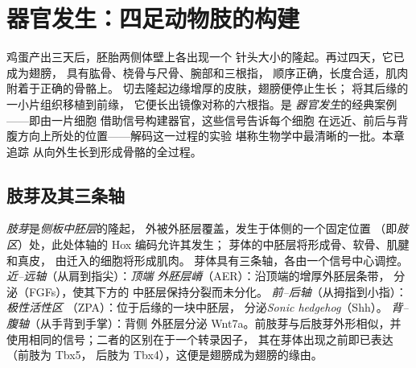 \chapter{器官发生：四足动物肢的构建}\label{ch:b2:limb-organogenesis}

鸡蛋产出三天后，胚胎两侧体壁上各出现一个
针头大小的隆起。再过四天，它已成为翅膀，
具有肱骨、桡骨与尺骨、腕部和三根指，
顺序正确，长度合适，肌肉附着于正确的骨骼上。
切去隆起边缘增厚的皮肤，翅膀便停止生长；
将其后缘的一小片组织移植到前缘，
它便长出镜像对称的六根指。是
\emph{器官发生}的经典案例——即由一片细胞
借助信号构建器官，这些信号告诉每个细胞
在远近、前后与背腹方向上所处的位置——解码这一过程的实验
堪称生物学中最清晰的一批。本章追踪
从向外生长到形成骨骼的全过程。

\section{肢芽及其三条轴}

\begin{definition}[肢芽]\label{def:b2:limb-organogenesis:bud}
\emph{肢芽}是\emph{侧板中胚层}的隆起，
外被外胚层覆盖，发生于体侧的一个固定位置
（即\emph{肢区}）处，此处体轴的 Hox 编码允许其发生；
芽体的中胚层将形成骨、软骨、肌腱和真皮，
由迁入的细胞将形成肌肉。
芽体具有三条轴，各由一个信号中心调控。
\emph{近–远轴}（从肩到指尖）：\emph{顶端
外胚层嵴}（AER）：沿顶端的增厚外胚层条带，
分泌（FGFs），使其下方的
中胚层保持分裂而未分化。
\emph{前–后轴}（从拇指到小指）：\emph{极性活性区
}（ZPA）：位于后缘的一块中胚层，
分泌\emph{Sonic hedgehog}（Shh）。
\emph{背–腹轴}（从手背到手掌）：背侧
外胚层分泌 Wnt7a。前肢芽与后肢芽外形相似，并
使用相同的信号；二者的区别在于一个转录因子，
其在芽体出现之前即已表达（前肢为 Tbx5，
后肢为 Tbx4），这便是翅膀成为翅膀的缘由。
\end{definition}


